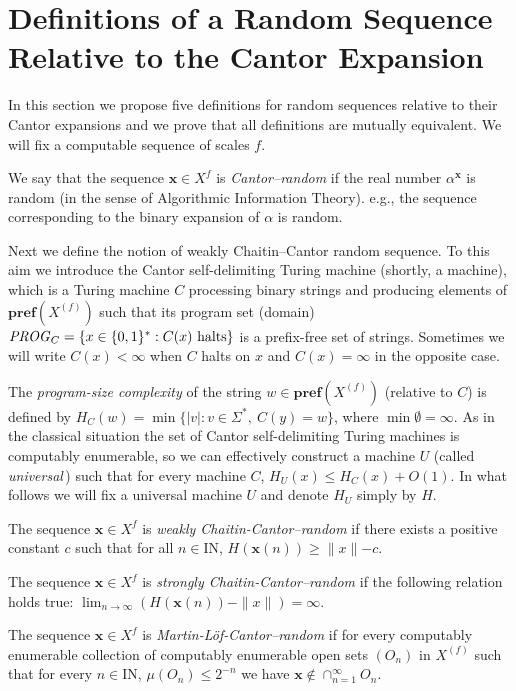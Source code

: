 \documentclass[11pt,a4paper,twoside]{article}
\def \pref#1{{\mathbf{pref}({#1})}}
\newcommand{\x}{{\mathbf x}}
\def \bbbn {\mathrm{I\!N}} %
\def \XF  {X^{(f)}}
\begin{document}
\section{Definitions of a Random Sequence Relative to the Cantor Expansion}


In this section we propose five definitions for random sequences relative to
their
Cantor expansions and we prove that all definitions are mutually equivalent.
We will fix a computable sequence of scales $f$.

We say that the sequence $\x \in X^{f}$ is {\it Cantor--random} if the real
number
$\alpha^{\x}$ is random (in the sense of Algorithmic Information Theory).
e.g., the sequence corresponding to the binary expansion of $\alpha$ is
random.


Next we define the notion of weakly Chaitin--Cantor random sequence. To this
aim we introduce the Cantor self-delimiting Turing machine (shortly, a
machine), which is a
 Turing machine $C$ processing binary strings and producing
elements of $\pref{\XF}$ such that its
program set (domain)
${\it PROG}_C=\{x\in\{0,1\}^* : C(x) \mbox{  halts}\}$
is   a prefix-free set of strings. Sometimes
we will write $C(x) < \infty$ when $C$ halts on $x$ and $C(x) = \infty$ in
the
opposite case. 

The {\em program-size complexity} of the string
$w\in\pref{\XF}$ (relative to $C$)
is  defined by $H_C(w)=\min \{|v| :  v \in \Sigma^*, \ C(y)=w\}$,
where $\min \emptyset = \infty$. As in the classical situation
the set of Cantor self-delimiting Turing machines is computably enumerable,
so we can effectively construct  a  machine $U$ (called  {\em universal}\,)
such
that  for every  machine
$C$, $H_U (x) \leq H_C (x) + O(1)$.
In what follows we will fix a universal machine $U$ and denote $H_U$ simply
by $H$.



The sequence $\x \in X^{f}$ is {\it weakly Chaitin-Cantor--random} if there
exists
a positive constant $c$ such that for all $n\in \bbbn$,  $H(\x(n)) \ge
\parallel x \parallel -c$.


The sequence $\x \in X^{f}$ is {\it strongly Chaitin-Cantor--random} if the
following relation holds true:  $\lim_{n
\to \infty} (H(\x(n)) - \parallel x \parallel) = \infty$.



The sequence $\x \in X^{f}$ is {\it Martin-L\" of-Cantor--random} if   for
every computably enumerable collection of computably enumerable open sets
$(O_n)$ in $\XF$ such that for every $n\in \bbbn$,  $\mu (O_n)
\le 2^{-n}$ we have $\x \not\in \cap_{n=1}^{\infty} O_n$.
\end{document}
